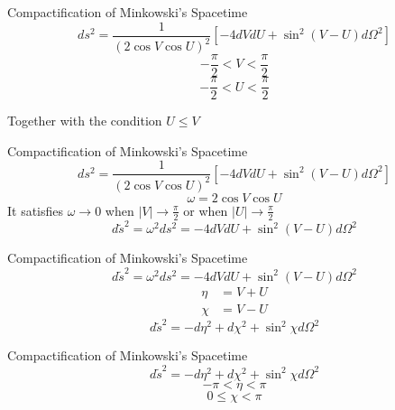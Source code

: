 \documentclass{beamer}
\begin{document}
        \begin{frame}{Compactification of Minkowski's Spacetime}
            $$ds^2 = \frac{1}{\left(2\cos V\cos U\right)^{2}} \left[ -4dVdU + \sin^2 \left( V - U \right) d\Omega^2 \right]$$
            \pause
            $$-\frac{\pi}{2}<  V  <\frac{\pi}{2}$$
            $$-\frac{\pi}{2}<  U  <\frac{\pi}{2}$$
            \pause
            \bigskip
            
            \centering
            {Together with the condition $U\leq V$}
    	\end{frame}
        
        \begin{frame}{Compactification of Minkowski's Spacetime}
            $$ds^2 = \frac{1}{\left(2\cos V\cos U\right)^{2}} \left[ -4dVdU + \sin^2 \left( V - U \right) d\Omega^2 \right]$$
            \pause
            $$\omega = 2\cos V\cos U$$
            \pause
            It satisfies $\omega\longrightarrow0$ when $\left| V \right| \longrightarrow \frac{\pi}{2}$ or when $\left|U\right|\longrightarrow\frac{\pi}{2}$\\
			\pause
			$$ d\tilde{s}^2 = \omega^2 ds^2 = -4dVdU + \sin^2 \left( V - U\right) d\Omega^2 $$
    	\end{frame}
        
        \begin{frame}{Compactification of Minkowski's Spacetime}
			$$ d\tilde{s}^2 = \omega^2 ds^2 = -4dVdU + \sin^2 \left( V - U\right) d\Omega^2 $$
            \pause
            \begin{align*}
				\eta &= V+U\\
				\chi &= V-U
			\end{align*}
            \pause
            $$ d\tilde{s}^2 = -d\eta^2 + d\chi^2 + \sin^2 \chi d\Omega^2 $$
    	\end{frame}
       	
        \begin{frame}{Compactification of Minkowski's Spacetime}
            $$ d\tilde{s}^2 = -d\eta^2 + d\chi^2 + \sin^2 \chi d\Omega^2 $$
            \pause
            $$-\pi<  \eta  <\pi$$
			$$0\leq  \chi  <\pi$$
    	\end{frame}
\end{document}
